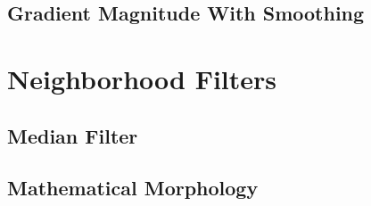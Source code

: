 

\subsection{Gradient Magnitude With Smoothing}
\label{sec:GradientMagnitudeRecursiveGaussianImageFilter}






\section{Neighborhood Filters}
\label{sec:NeighborhoodFilters}

\subsection{Median Filter}
\label{sec:MedianFilter}




\subsection{Mathematical Morphology}
\label{sec:MathematicalMorphology}





